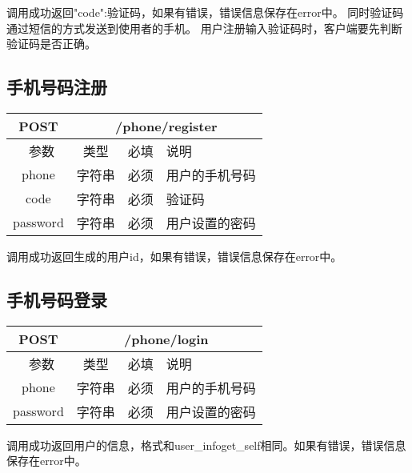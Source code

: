 调用成功返回{"code":验证码}，如果有错误，错误信息保存在error中。
同时验证码通过短信的方式发送到使用者的手机。
用户注册输入验证码时，客户端要先判断验证码是否正确。



\subsection{手机号码注册}
\label{hash_algorithm}

\begin{table}[H]
   \begin{center}
\begin{tabular}{|c|c|c|p{12cm}|}
\hline
POST & \multicolumn{3}{|c|}{/phone/register} \\
\hline\hline
 \  参数  & 类型 & 必填 &  说明  \\
\hline
 phone  & 字符串 & 必须 &  用户的手机号码\\
\hline
 code  & 字符串 & 必须 &  验证码\\
\hline
 password  & 字符串 & 必须 &  用户设置的密码\\
\hline
\end{tabular}
   \end{center}
\end{table}

调用成功返回生成的用户id，如果有错误，错误信息保存在error中。



\subsection{手机号码登录}
\label{hash_algorithm}

\begin{table}[H]
   \begin{center}
\begin{tabular}{|c|c|c|p{12cm}|}
\hline
POST & \multicolumn{3}{|c|}{/phone/login} \\
\hline\hline
 \  参数  & 类型 & 必填 &  说明  \\
\hline
 phone  & 字符串 & 必须 &  用户的手机号码\\
\hline
 password  & 字符串 & 必须 &  用户设置的密码\\
\hline
\end{tabular}
   \end{center}
\end{table}

调用成功返回用户的信息，格式和user\_info\/get\_self相同。如果有错误，错误信息保存在error中。



